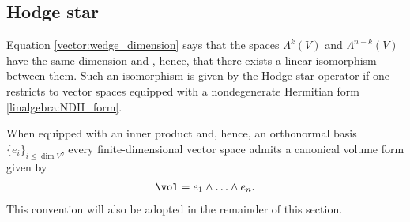 \subsection{Hodge star}

    Equation \eqref{vector:wedge_dimension} says that the spaces $\Lambda^k(V)$ and $\Lambda^{n-k}(V)$ have the same dimension and , hence, that there exists a linear isomorphism between them. Such an isomorphism is given by the Hodge star operator if one restricts to vector spaces equipped with a nondegenerate Hermitian form \ref{linalgebra:NDH_form}.

    When equipped with an inner product and, hence, an orthonormal basis $\{e_i\}_{i\leq\dim V}$, every finite-dimensional vector space admits a canonical volume form given by
    \begin{gather}
        \vol = e_1\wedge\ldots\wedge e_n.
    \end{gather}
    This convention will also be adopted in the remainder of this section.



